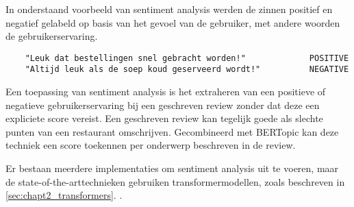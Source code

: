 In onderstaand voorbeeld van sentiment analysis werden de zinnen positief en negatief gelabeld op basis van het gevoel van de gebruiker, met andere woorden de gebruikerservaring.

\begin{Verbatim}
    "Leuk dat bestellingen snel gebracht worden!"             POSITIVE
    "Altijd leuk als de soep koud geserveerd wordt!"          NEGATIVE
\end{Verbatim}

Een toepassing van sentiment analysis is het extraheren van een positieve of negatieve gebruikerservaring bij een geschreven review zonder dat deze een expliciete score vereist. Een geschreven review kan tegelijk goede als slechte punten van een restaurant omschrijven. Gecombineerd met BERTopic kan deze techniek een score toekennen per onderwerp beschreven in de review.

Er bestaan meerdere implementaties om sentiment analysis uit te voeren, maar de state-of-the-arttechnieken gebruiken transformermodellen, zoals beschreven in \autoref{sec:chapt2_transformers}. \cite{sentiment_older_paper, sentiment_transformer_paper}.


